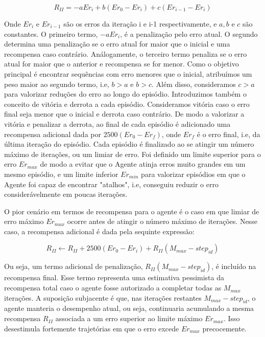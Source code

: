 \begin{equation}
\label{eq:eqR2}
    R_{II} = -aEr_{i} + b(Er_{0} - Er_{i}) + c(Er_{i-1} - Er_{i})
\end{equation}

\noindent
Onde $Er_{i}$ e $Er_{i-1}$ são os erros da iteração i e i-1 respectivamente, e $a, b$ e $c$ são constantes. 
O primeiro termo, $-aEr_{i}$, é a penalização pelo erro atual.
O segundo determina uma penalização se o erro atual for maior que o inicial e uma recompensa caso contrário.
Análogamente, o terceiro termo penaliza se o erro atual for maior que o anterior e recompensa se for menor.
Como o objetivo principal é encontrar sequências com erro menores que o inicial, atribuímos um peso maior ao segundo termo,
i.e, $b>a$ e $b>c$.
Além disso, consideramos $c>a$ para valorizar reduções do erro ao longo do episódio.  
Introduzimos também o conceito de vitória e derrota a cada episódio. 
Consideramos vitória caso o erro final seja menor que o inicial e derrota caso contrário. 
De modo a valorizar a vitória e penalizar a derrota, 
ao final de cada episódio é adicionado uma recompensa adicional dada por $2500(Er_{0} - Er_{f})$, 
onde $Er_{f}$ é o erro final, i.e, da última iteração do episódio. 
Cada episódio é finalizado ao se atingir um número máximo de iterações, ou um limiar de erro. 
Foi definido um limite superior para o erro $Er_{max}$ de modo a evitar que o Agente atinja erros muito grandes em um mesmo episódio,
e um limite inferior $Er_{min}$ para valorizar episódios em que o Agente foi capaz de encontrar "atalhos", i.e,
conseguiu reduzir o erro considerávelmente em poucas iterações.

O pior cenário em termos de recompensa para o agente é o caso em que limiar de erro máximo $Er_{max}$ ocorre antes de atingir o número máximo 
de iterações. Nesse caso, a recompensa adicional é dada pela sequinte expressão:

\begin{equation}
  \label{eq:R2adicional}
      R_{II} \gets R_{II} + 2500(Er_{0} - Er_{i}) + R_{II}(M_{max} - step_{id})
\end{equation}

Ou seja, um termo adicional de penalização,
$R_{II}(M_{max} - step_{id})$, é incluído na recompensa final.
Esse termo representa uma estimativa pessimista da recompensa total caso o agente fosse autorizado 
a completar todas as $M_{max}$ iterações. 
A suposição subjacente é que, nas iterações restantes $M_{max} - step_{id}$, 
o agente manteria o desempenho atual, ou seja, continuaria acumulando a mesma recompensa $R_{II}$ 
associada a um erro superior ao limite máximo $Er_{max}$. 
Isso desestimula fortemente trajetórias em que o erro excede $Er_{max}$ precocemente.


